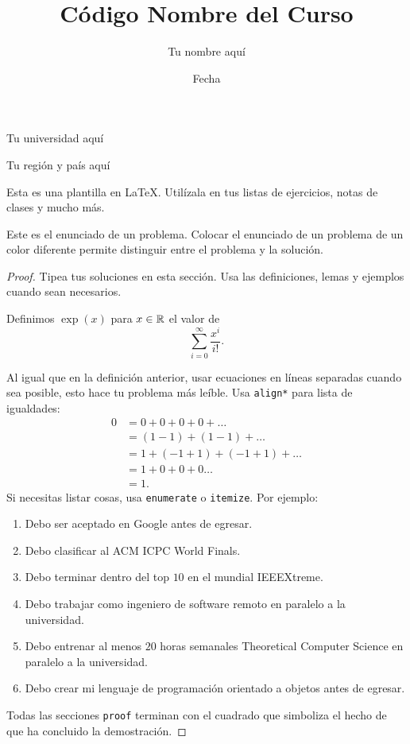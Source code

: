 \title{C\'odigo Nombre del Curso}
\author{Tu nombre aqu\'i}
\date{Fecha}



\maketitle

\vspace*{-0.25in}
\centerline{Tu universidad aqu\'i}
\centerline{Tu regi\'on y pa\'is aqu\'i}
\centerline{}
\vspace*{0.15in}

\begin{framed}
  Esta es una plantilla en \LaTeX.
  Util\'izala en tus listas de ejercicios, notas de clases y mucho m\'as.
\end{framed}

\begin{statement}{1}
    Este es el enunciado de un problema.
    Colocar el enunciado de un problema de un color diferente permite distinguir entre el problema y la soluci\'on.
\end{statement}

\begin{proof}
    Tipea tus soluciones en esta secci\'on. Usa las definiciones, lemas y ejemplos cuando sean necesarios.
    \begin{defn}
        Definimos $\exp(x)$ para $x \in \mathbb{R}$ el valor de $$\sum_{i = 0}^\infty\frac{x^i}{i!}.$$
    \end{defn}
    Al igual que en la definici\'on anterior,
    usar ecuaciones en l\'ineas separadas cuando sea posible,
    esto hace tu problema m\'as le\'ible. Usa \texttt{align*} para lista de igualdades:
    \begin{align*}
        0 &= 0 + 0 + 0 + 0 + \dots\\
        &= (1 - 1) + (1 - 1) + \dots \\
        &= 1 + (-1 + 1) + (-1 + 1) + \dots \\
        &= 1 + 0 + 0 + 0 \dots \\
        &= 1.
    \end{align*}
    Si necesitas listar cosas, usa \texttt{enumerate} o \texttt{itemize}.
    Por ejemplo:
    \begin{enumerate}
        \item Debo ser aceptado en Google antes de egresar.
        \item Debo clasificar al ACM ICPC World Finals.
        \item Debo terminar dentro del top $10$ en el mundial IEEEXtreme.
        \item Debo trabajar como ingeniero de software remoto en paralelo a la universidad.
        \item Debo entrenar al menos $20$ horas semanales Theoretical Computer Science en paralelo a la universidad.
        \item Debo crear mi lenguaje de programaci\'on orientado a objetos antes de egresar.
    \end{enumerate}
    Todas las secciones \texttt{proof} terminan con el cuadrado que simboliza el hecho de que ha concluido la demostraci\'on.
\end{proof}

